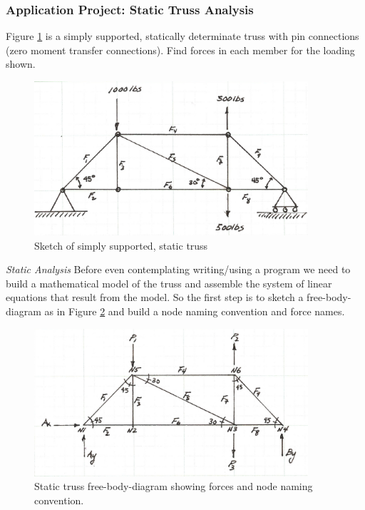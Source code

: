 \subsubsection{Application Project: Static Truss Analysis}
Figure \ref{fig:StaticTrussSketch} is a simply supported, statically determinate truss with pin connections (zero moment transfer connections).   Find forces in each member for the loading shown.
\begin{figure}[htbp] %
   \centering
   \includegraphics[width=4in]{./9-Matrix/StaticTrussSketch.jpg} 
   \caption{Sketch of simply supported, static truss}
   \label{fig:StaticTrussSketch}
\end{figure}

\textsl{Static Analysis}
Before even contemplating writing/using a program we need to build a mathematical model of the truss and assemble the system of linear equations that result from the model.  So the first step is to sketch a free-body-diagram as in Figure \ref{fig:StaticTrussFBD} and build a node naming convention and force names.

\begin{figure}[h!] %
   \centering
   \includegraphics[width=4in]{./9-Matrix/StaticTrussFBD.jpg} 
   \caption{Static truss free-body-diagram showing forces and node naming convention.}
   \label{fig:StaticTrussFBD}
\end{figure}

